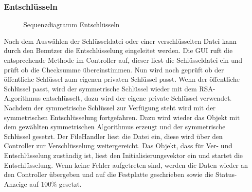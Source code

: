 \documentclass[12pt,a4paper,titlepage]{article}
\begin{document}
\subsubsection{Entschlüsseln}
\begin{figure}[ht]
  \centering
  \caption{Sequenzdiagramm Entschlüsseln}
  \label{seq_diagramdecrypt}
\end{figure}

Nach dem Auswählen der Schlüsseldatei oder einer verschlüsselten Datei kann durch den Benutzer die Entschlüsselung eingeleitet werden. Die GUI ruft die entsprechende Methode im Controller auf, dieser liest die Schlüsseldatei ein und prüft ob die Checksumme übereinstimmen. Nun wird noch geprüft ob der öffentliche Schlüssel zum eigenen privaten Schlüssel passt. Wenn der öffentliche Schlüssel passt, wird der symmetrische Schlüssel wieder mit dem RSA-Algorithmus entschlüsselt, dazu wird der eigene private Schlüssel verwendet. Nachdem der symmetrische Schlüssel zur Verfügung steht wird mit der symmetrischen Entschlüsselung fortgefahren. Dazu wird wieder das Objekt mit dem gewählten symmetrischen Algorithmus erzeugt und der symmetrische Schlüssel gesetzt. Der FileHandler liest die Datei ein, diese wird über den Controller zur Verschlüsselung weitergereicht. Das Objekt, dass für Ver- und Entschlüsselung zuständig ist, liest den Initialisierungsvektor ein und startet die Entschlüsselung. Wenn keine Fehler aufgetreten sind, werden die Daten wieder an den Controller übergeben und auf die Festplatte geschrieben sowie die Status-Anzeige auf 100\% gesetzt.
\newpage
\end{document}
